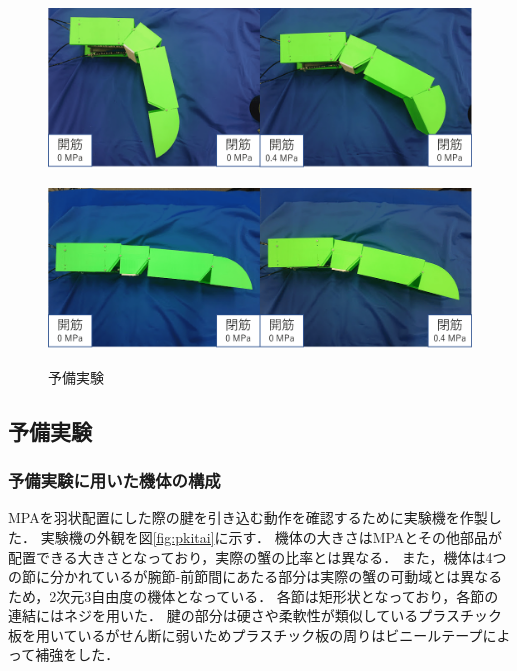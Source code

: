 %
\begin{figure}[t]
  \begin{minipage}{1\hsize}
    \centering
    \includegraphics[scale=0.14]{image/yobi_open.png}
    \vspace{-1mm}
    \label{fig:popen}
  \end{minipage}
  \begin{minipage}{1\hsize}
    \centering
    \vspace{3mm}
    \includegraphics[scale=0.14]{image/yobi_close.png}
    \label{fig:pclose}
  \end{minipage}
  \caption{予備実験}
  \label{fig:yobijikken}
\end{figure}
\subsection{予備実験}
\subsubsection{予備実験に用いた機体の構成}
MPAを羽状配置にした際の腱を引き込む動作を確認するために実験機を作製した．
実験機の外観を図\ref{fig:pkitai}に示す．
機体の大きさはMPAとその他部品が配置できる大きさとなっており，実際の蟹の比率とは異なる．
また，機体は4つの節に分かれているが腕節-前節間にあたる部分は実際の蟹の可動域とは異なるため，2次元3自由度の機体となっている．
各節は矩形状となっており，各節の連結にはネジを用いた．
腱の部分は硬さや柔軟性が類似しているプラスチック板を用いているがせん断に弱いためプラスチック板の周りはビニールテープによって補強をした．
%
